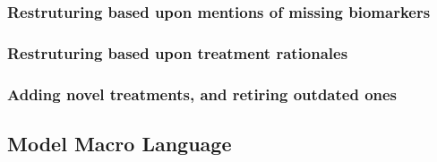 \documentclass[twocolumn]{bmcart}%
\begin{document}
\subsubsection{Restruturing based upon mentions of missing biomarkers}\label{sec:TR-restructuring}

\subsubsection{Restruturing based upon treatment rationales}\label{sec:TR-restructuring}

\subsubsection{Adding novel treatments, and retiring outdated ones}\label{sec:TR-restructuring}

\subsection{Model Macro Language}\label{sec:macro-model}


\end{document}
